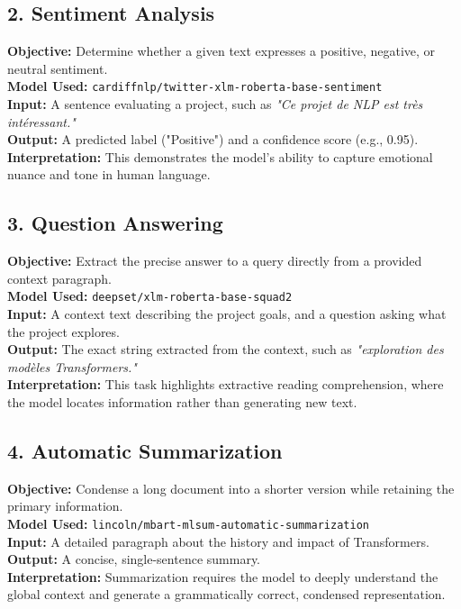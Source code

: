 \documentclass[11pt,a4paper]{article}
\begin{document}
\subsection{2. Sentiment Analysis}
\textbf{Objective:} Determine whether a given text expresses a positive, negative, or neutral sentiment. \\
\textbf{Model Used:} \texttt{cardiffnlp/twitter-xlm-roberta-base-sentiment} \\
\textbf{Input:} A sentence evaluating a project, such as \textit{"Ce projet de NLP est très intéressant."} \\
\textbf{Output:} A predicted label ("Positive") and a confidence score (e.g., 0.95). \\
\textbf{Interpretation:} This demonstrates the model's ability to capture emotional nuance and tone in human language.

\subsection{3. Question Answering}
\textbf{Objective:} Extract the precise answer to a query directly from a provided context paragraph. \\
\textbf{Model Used:} \texttt{deepset/xlm-roberta-base-squad2} \\
\textbf{Input:} A context text describing the project goals, and a question asking what the project explores. \\
\textbf{Output:} The exact string extracted from the context, such as \textit{"exploration des modèles Transformers."} \\
\textbf{Interpretation:} This task highlights extractive reading comprehension, where the model locates information rather than generating new text.

\subsection{4. Automatic Summarization}
\textbf{Objective:} Condense a long document into a shorter version while retaining the primary information. \\
\textbf{Model Used:} \texttt{lincoln/mbart-mlsum-automatic-summarization} \\
\textbf{Input:} A detailed paragraph about the history and impact of Transformers. \\
\textbf{Output:} A concise, single-sentence summary. \\
\textbf{Interpretation:} Summarization requires the model to deeply understand the global context and generate a grammatically correct, condensed representation.
\newpage
\end{document}
